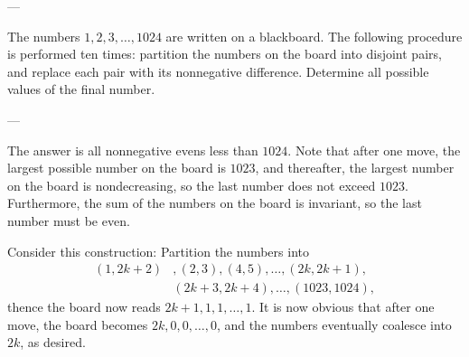 
---

The numbers $1,2,3,\ldots,1024$ are written on a blackboard. The following procedure is performed ten times: partition the numbers on the board into disjoint pairs, and replace each pair with its nonnegative difference. Determine all possible values of the final number.

---

The answer is all nonnegative evens less than $1024$. Note that after one move, the largest possible number on the board is $1023$, and thereafter, the largest number on the board is nondecreasing, so the last number does not exceed $1023$. Furthermore, the sum of the numbers on the board is invariant, so the last number must be even.

Consider this construction: Partition the numbers into
\begin{align*}
    (1,2k+2)&,(2,3),(4,5),\ldots,(2k,2k+1),\\ &(2k+3,2k+4),\ldots,(1023,1024),
\end{align*}
thence the board now reads $2k+1,1,1,\ldots,1$. It is now obvious that after one move, the board becomes $2k,0,0,\ldots,0$, and the numbers eventually coalesce into $2k$, as desired.
